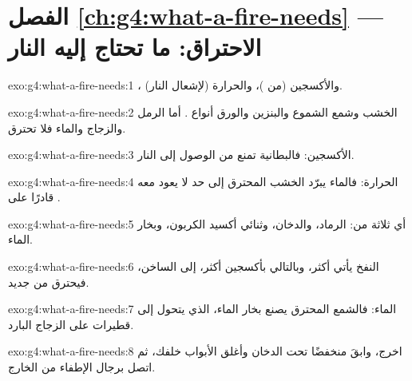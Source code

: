 \section*{الفصل \ref{ch:g4:what-a-fire-needs} --- الاحتراق: ما تحتاج إليه النار}

\begin{solution}{exo:g4:what-a-fire-needs:1}
، والأكسجين (من )، والحرارة (لإشعال النار).
\end{solution}

\begin{solution}{exo:g4:what-a-fire-needs:2}
الخشب وشمع الشموع والبنزين والورق أنواع . أما الرمل والزجاج والماء
فلا تحترق.
\end{solution}

\begin{solution}{exo:g4:what-a-fire-needs:3}
الأكسجين: فالبطانية تمنع  من الوصول إلى النار.
\end{solution}

\begin{solution}{exo:g4:what-a-fire-needs:4}
الحرارة: فالماء يبرّد الخشب المحترق إلى حد لا يعود معه قادرًا على
.
\end{solution}

\begin{solution}{exo:g4:what-a-fire-needs:5}
أي ثلاثة من: الرماد، والدخان، وثنائي أكسيد الكربون، وبخار الماء.
\end{solution}

\begin{solution}{exo:g4:what-a-fire-needs:6}
النفخ يأتي  أكثر، وبالتالي بأكسجين أكثر، إلى  الساخن، فيحترق
من جديد.
\end{solution}

\begin{solution}{exo:g4:what-a-fire-needs:7}
الماء: فالشمع المحترق يصنع بخار الماء، الذي يتحول إلى قطيرات على
الزجاج البارد.
\end{solution}

\begin{solution}{exo:g4:what-a-fire-needs:8}
اخرج، وابقَ منخفضًا تحت الدخان وأغلق الأبواب خلفك، ثم اتصل برجال
الإطفاء من الخارج.
\end{solution}

